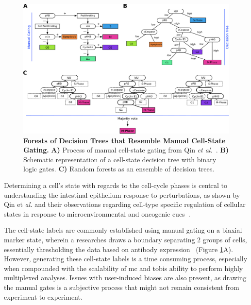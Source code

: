 \begin{figure}[H]
    \centering
    \includegraphics{03cytof/figs/3CLASS_stateRF.png}
    \caption{\textbf{Forests of Decision Trees that Resemble Manual Cell-State Gating.} \textbf{A)} Process of manual cell-state gating from Qin \emph{et al.}~\cite{qin_cell-type-specific_2020}. \textbf{B)} Schematic representation of a cell-state decision tree with binary logic gates. \textbf{C)} Random forests as an ensemble of decision trees.}
    \label{fig:3classover}
\end{figure}

Determining a cell's state with regards to the cell-cycle phases is central to understanding the intestinal epithelium response to perturbations, as shown by Qin et \emph{al.} and their observations regarding cell-type specific regulation of cellular states in response to microenvironmental and oncogenic cues~\cite{qin_cell-type-specific_2020}.

The cell-state labels are commonly established using manual gating on a biaxial marker state, wherein a researches draws a boundary separating 2 groups of cells, essentially thresholding the data based on antibody expression~\cite{qin_cell-type-specific_2020} (Figure \ref{fig:3classover}A). However, generating these cell-state labels is a time consuming process, especially when compounded with the scalability of \acrshort{mc} and \acrshort{tobis} ability to perform highly multiplexed analyses. Issues with user-induced biases are also present, as drawing the manual gates is a subjective process that might not remain consistent from experiment to experiment.

